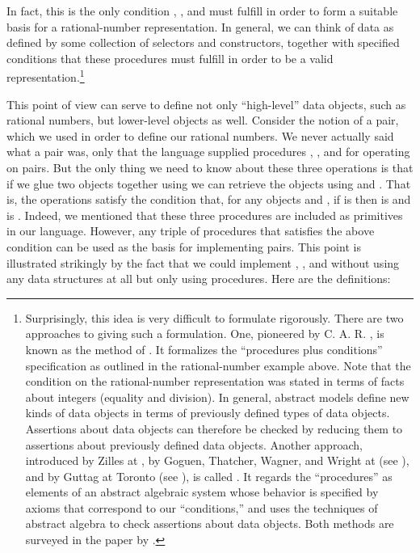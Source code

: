 In fact, this is the only condition , , and
 must fulfill in order to form a suitable basis for a
rational-number representation.  In general, we can think of data as defined by
some collection of selectors and constructors, together with specified
conditions that these procedures must fulfill in order to be a valid
representation.\footnote{Surprisingly, this idea is very difficult to formulate
rigorously. There are two approaches to giving such a formulation.  One,
pioneered by C. A. R. , is known as the method of .  It formalizes the ``procedures plus conditions'' specification as
outlined in the rational-number example above.  Note that the condition on the
rational-number representation was stated in terms of facts about integers
(equality and division).  In general, abstract models define new kinds of data
objects in terms of previously defined types of data objects.  Assertions about
data objects can therefore be checked by reducing them to assertions about
previously defined data objects.  Another approach, introduced by Zilles at
, by Goguen, Thatcher, Wagner, and Wright at 
(see ),
and by Guttag at Toronto (see ), is called
.  It regards the ``procedures'' as elements
of an abstract algebraic system whose behavior is specified by axioms that
correspond to our ``conditions,'' and uses the techniques of abstract algebra
to check assertions about data objects.  Both methods are surveyed in the paper
by .}

This point of view can serve to define not only ``high-level'' data objects,
such as rational numbers, but lower-level objects as well.  Consider the notion
of a pair, which we used in order to define our rational numbers.  We never
actually said what a pair was, only that the language supplied procedures
, , and  for operating on pairs.  But the only
thing we need to know about these three operations is that if we glue two
objects together using  we can retrieve the objects using 
and .  That is, the operations satisfy the condition that, for any
objects  and , if  is  then  is  and  is .  Indeed, we mentioned that
these three procedures are included as primitives in our language.  However,
any triple of procedures that satisfies the above condition can be used as the
basis for implementing pairs.  This point is illustrated strikingly by the fact
that we could implement , , and  without using
any data structures at all but only using procedures.  Here are the
definitions:

